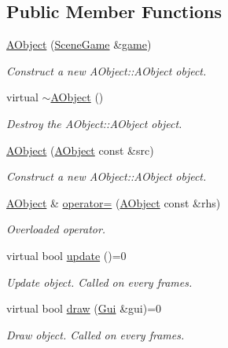 \subsection*{Public Member Functions}
\begin{DoxyCompactItemize}
\item 
\hyperlink{class_a_object_aac94ec1c7dd0ec00fda2a79f12195cf2}{A\+Object} (\hyperlink{class_scene_game}{Scene\+Game} \&\hyperlink{class_a_entity_aa2c05db944a8b7487eb8470dd20211ab}{game})
\begin{DoxyCompactList}\small\item\em Construct a new A\+Object\+::\+A\+Object object. \end{DoxyCompactList}\item 
\mbox{\label{class_a_object_ac17f3a1944792c280a3cbd83d839bc4e}} 
virtual \hyperlink{class_a_object_ac17f3a1944792c280a3cbd83d839bc4e}{$\sim$\+A\+Object} ()
\begin{DoxyCompactList}\small\item\em Destroy the A\+Object\+::\+A\+Object object. \end{DoxyCompactList}\item 
\hyperlink{class_a_object_a278727c68ad694b228c2f24e5e6d358a}{A\+Object} (\hyperlink{class_a_object}{A\+Object} const \&src)
\begin{DoxyCompactList}\small\item\em Construct a new A\+Object\+::\+A\+Object object. \end{DoxyCompactList}\item 
\hyperlink{class_a_object}{A\+Object} \& \hyperlink{class_a_object_a9752ad3eadac3a51ef78d81a34fc5bcd}{operator=} (\hyperlink{class_a_object}{A\+Object} const \&rhs)
\begin{DoxyCompactList}\small\item\em Overloaded operator. \end{DoxyCompactList}\item 
virtual bool \hyperlink{class_a_object_af35bb4b68af0a11bb1fcf617bde41ecd}{update} ()=0
\begin{DoxyCompactList}\small\item\em Update object. Called on every frames. \end{DoxyCompactList}\item 
virtual bool \hyperlink{class_a_object_a5e454e13e04ee937c20a465244cf748a}{draw} (\hyperlink{class_gui}{Gui} \&gui)=0
\begin{DoxyCompactList}\small\item\em Draw object. Called on every frames. \end{DoxyCompactList}\item 

\end{DoxyCompactItemize}
